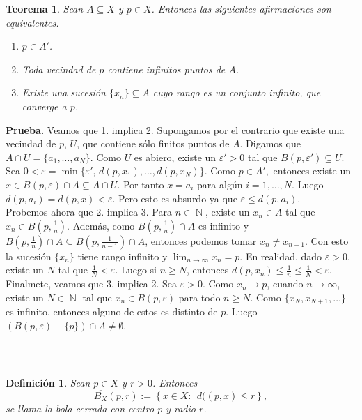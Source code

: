 \documentclass[x11names, 12pt]{book}
\newtheorem{definicion}{Definición}
\newtheorem{teorema}{Teorema}
\newenvironment{prueba}[1][Prueba]{\noindent\textbf{#1.} }{\ \rule{0.5em}{0.5em}}
\DeclareMathOperator{\ene}{\mathbb{N}}
\begin{document}
\begin{teorema}\label{teo-acum1}
Sean $A\subseteq X$ y $p\in X$. Entonces las siguientes afirmaciones son equivalentes.
\begin{enumerate}
    \item $p\in A'$.
    \item Toda vecindad de $p$ contiene infinitos puntos de $A$.
    \item Existe una sucesión $\{x_n\}\subseteq A$ cuyo rango es un conjunto infinito, que converge a $p$.
\end{enumerate}
\end{teorema}
\begin{prueba}
Veamos que 1. implica 2. Supongamos por el contrario que existe una vecindad de $p$, $U$, que contiene sólo finitos puntos de $A$. Digamos que  $A\cap U=\{a_1, \dots , a_N\}$. Como $U$ es abiero, existe un $\varepsilon ' >0$ tal que $B(p, \varepsilon')\subseteq U$.  Sea $0<\varepsilon=\min \{\varepsilon ', \, d(p, x_1), \dots , d(p, x_N)\}.$  Como $p\in A', $ entonces existe un $x\in B(p, \varepsilon) \cap A \subseteq A\cap U$. Por tanto $x=a_i$ para algún $i=1, \dots, N$. Luego $d(p,a_i)=d(p,x)<\varepsilon$. Pero esto es absurdo ya que $\varepsilon \leq d(p, a_i).$\\

Probemos ahora que 2. implica 3. Para $n\in \ene$, existe un $x_n\in A$ tal que $x_n\in B(p, \frac{1}n).$ Además, como $B(p, \frac{1}{n}) \cap A$ es infinito y $B(p, \frac{1}{n}) \cap A\subseteq B(p, \frac{1}{n-1}) \cap A$, entonces podemos tomar $x_n \neq x_{n-1}.$ Con esto la sucesión $\{x_n\}$ tiene rango infinito y $\lim_{n\to \infty}x_n=p$. En realidad, dado $\varepsilon>0$, existe un $N$ tal que $\frac{1}N<\varepsilon$. Luego si $n\geq N$, entonces $d(p, x_n )\leq \frac{1}n \leq \frac{1}N <\varepsilon .$\\

Finalmete, veamos que 3. implica 2. Sea $\varepsilon >0.$ Como $x_n \to p$, cuando $n\to \infty $, existe un $N\in \ene$ tal que $x_n \in B(p, \varepsilon)$ para todo $n\geq N.$ Como $\{x_N, x_{N+1}, \dots\}$ es infinito, entonces alguno de estos es distinto de $p$. Luego $\left( B(p, \varepsilon)-\{p\} \right) \cap A \neq \emptyset .$

\end{prueba}


\begin{definicion}
    Sean $p\in X$ y $r>0$. Entonces $$\overline{B_X}(p,r):=\left\{ x\in X:\ \ d((p,x)\leq r \right\} ,$$
    se llama la bola cerrada con centro $p$ y radio $r$.
\end{definicion}
\end{document}
